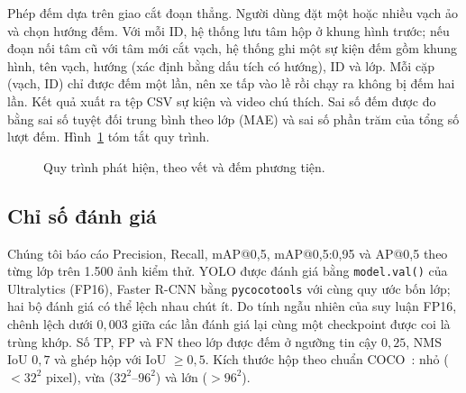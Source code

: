 \documentclass[10pt,journal,letterpaper]{IEEEtran}
\begin{document}
Phép đếm dựa trên giao cắt đoạn thẳng. Người dùng đặt một hoặc nhiều vạch ảo và chọn hướng đếm. Với mỗi ID, hệ thống lưu tâm hộp ở khung hình trước; nếu đoạn nối tâm cũ với tâm mới cắt vạch, hệ thống ghi một sự kiện đếm gồm khung hình, tên vạch, hướng (xác định bằng dấu tích có hướng), ID và lớp. Mỗi cặp (vạch, ID) chỉ được đếm một lần, nên xe tấp vào lề rồi chạy ra không bị đếm hai lần. Kết quả xuất ra tệp CSV sự kiện và video chú thích. Sai số đếm được đo bằng sai số tuyệt đối trung bình theo lớp (MAE) và sai số phần trăm của tổng số lượt đếm. Hình~\ref{fig:pipe} tóm tắt quy trình.

\begin{figure}[!t]
\centering
{}
\caption{Quy trình phát hiện, theo vết và đếm phương tiện.}
\label{fig:pipe}
\end{figure}

\subsection{Chỉ số đánh giá}
Chúng tôi báo cáo Precision, Recall, mAP@0,5, mAP@0,5:0,95 và AP@0,5 theo từng lớp trên 1.500 ảnh kiểm thử. YOLO được đánh giá bằng \texttt{model.val()} của Ultralytics (FP16), Faster R-CNN bằng \texttt{pycocotools} với cùng quy ước bốn lớp; hai bộ đánh giá có thể lệch nhau chút ít. Do tính ngẫu nhiên của suy luận FP16, chênh lệch dưới $0{,}003$ giữa các lần đánh giá lại cùng một checkpoint được coi là trùng khớp. Số TP, FP và FN theo lớp được đếm ở ngưỡng tin cậy $0{,}25$, NMS IoU $0{,}7$ và ghép hộp với IoU $\ge0{,}5$. Kích thước hộp theo chuẩn COCO~\cite{coco}: nhỏ ($<32^2$ pixel), vừa ($32^2$--$96^2$) và lớn ($>96^2$).
\end{document}
